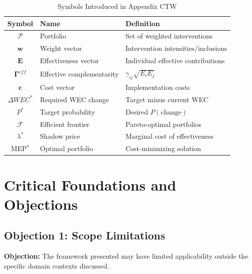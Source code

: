 \label{sec:mep-glossary}

\begin{table}[htbp]
\centering
\caption{Symbols Introduced in Appendix CTW}
\label{tab:mep-symbols}
\renewcommand{\arraystretch}{1.3}
\begin{tabular}{@{}clp{5.5cm}@{}}
\toprule
\textbf{Symbol} & \textbf{Name} & \textbf{Definition} \\
\midrule
$\mathcal{P}$ & Portfolio & Set of weighted interventions \\
$\mathbf{w}$ & Weight vector & Intervention intensities/inclusions \\
$\mathbf{E}$ & Effectiveness vector & Individual effective contributions \\
$\boldsymbol{\Gamma}^{eff}$ & Effective complementarity & $\gamma_{ij}\sqrt{E_i E_j}$ \\
$\mathbf{c}$ & Cost vector & Implementation costs \\
$\Delta WEC^*$ & Required WEC change & Target minus current WEC \\
$P^*$ & Target probability & Desired $P(\text{change})$ \\
$\mathcal{F}$ & Efficient frontier & Pareto-optimal portfolios \\
$\lambda^*$ & Shadow price & Marginal cost of effectiveness \\
MEP$^*$ & Optimal portfolio & Cost-minimizing solution \\
\bottomrule
\end{tabular}
\end{table}



\section{Critical Foundations and Objections}
\label{sec:mes-foundations}

\subsection{Objection 1: Scope Limitations}

\textbf{Objection:} The framework presented may have limited applicability
outside the specific domain contexts discussed.

